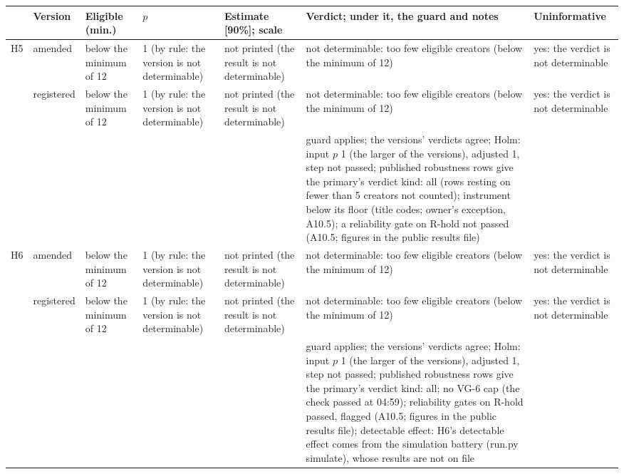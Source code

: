 {\tiny\setlength{\tabcolsep}{2pt}
\begin{tabular}{@{}p{}p{}p{}p{}p{}p{}p{}@{}}
\toprule
 & Version & Eligible (min.) & $p$ & Estimate [90\%]; scale & Verdict; under it, the guard and notes & Uninformative \\
\midrule
H5 & amended & below the minimum of 12 & 1 (by rule: the version is not determinable) & not printed (the result is not determinable) & not determinable: too few eligible creators (below the minimum of 12) & yes: the verdict is not determinable \\
 & registered & below the minimum of 12 & 1 (by rule: the version is not determinable) & not printed (the result is not determinable) & not determinable: too few eligible creators (below the minimum of 12) & yes: the verdict is not determinable \\
 &  &  &  &  & guard applies; the versions' verdicts agree; Holm: input $p$ 1 (the larger of the versions), adjusted 1, step not passed; published robustness rows give the primary's verdict kind: all (rows resting on fewer than 5 creators not counted); instrument below its floor (title codes; owner's exception, A10.5); a reliability gate on R-hold not passed (A10.5; figures in the public results file) &  \\
\midrule
H6 & amended & below the minimum of 12 & 1 (by rule: the version is not determinable) & not printed (the result is not determinable) & not determinable: too few eligible creators (below the minimum of 12) & yes: the verdict is not determinable \\
 & registered & below the minimum of 12 & 1 (by rule: the version is not determinable) & not printed (the result is not determinable) & not determinable: too few eligible creators (below the minimum of 12) & yes: the verdict is not determinable \\
 &  &  &  &  & guard applies; the versions' verdicts agree; Holm: input $p$ 1 (the larger of the versions), adjusted 1, step not passed; published robustness rows give the primary's verdict kind: all; no VG-6 cap (the check passed at 04:59); reliability gates on R-hold passed, flagged (A10.5; figures in the public results file); detectable effect: H6's detectable effect comes from the simulation battery (run.py simulate), whose results are not on file &  \\

\end{tabular}}
